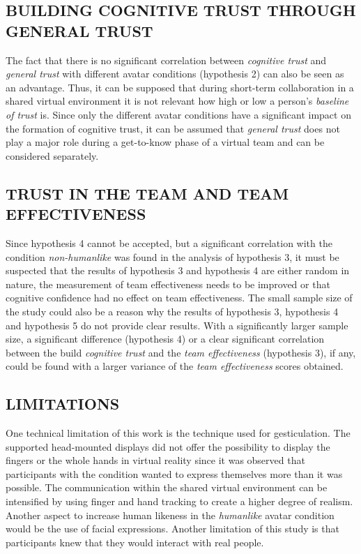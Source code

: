 \documentclass[sigchi]{acmart}
\begin{document}
\subsection{BUILDING COGNITIVE TRUST THROUGH GENERAL TRUST}
The fact that there is no significant correlation between \textit{cognitive trust} and \textit{general trust} with different avatar conditions (hypothesis 2) can also be seen as an advantage.
Thus, it can be supposed that during short-term collaboration in a shared virtual environment it is not relevant how high or low a person's \textit{baseline of trust} is. 
Since only the different avatar conditions have a significant impact on the formation of cognitive trust, it can be assumed that \textit{general trust} does not play a major role during a get-to-know phase of a virtual team and can be considered separately. %

\subsection{TRUST IN THE TEAM AND TEAM EFFECTIVENESS}
Since hypothesis 4 cannot be accepted, but a significant correlation with the condition \textit{non-humanlike} was found in the analysis of hypothesis 3, it must be suspected that the results of hypothesis 3 and hypothesis 4 are either random in nature, the measurement of team effectiveness needs to be improved or that cognitive confidence had no effect on team effectiveness.
The small sample size of the study could also be a reason why the results of hypothesis 3, hypothesis 4 and hypothesis 5 do not provide clear results. With a significantly larger sample size, a significant difference (hypothesis 4) or a clear significant correlation between the build \textit{cognitive trust} and the \textit{team effectiveness} (hypothesis 3), if any, could be found with a larger variance of the \textit{team effectiveness} scores obtained.

\subsection{LIMITATIONS}
One technical limitation of this work is the technique used for gesticulation. The supported head-mounted displays did not offer the possibility to display the fingers or the whole hands in virtual reality since it was observed that participants with the condition  wanted to express themselves more than it was possible. The communication within the shared virtual environment can be intensified by using finger and hand tracking to create a higher degree of realism. Another aspect to increase human likeness in the \textit{humanlike} avatar condition would be the use of facial expressions.
Another limitation of this study is that participants knew that they would interact with real people. %
\end{document}
